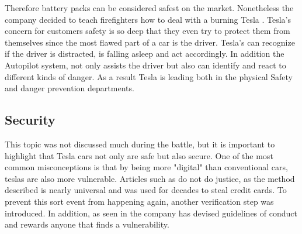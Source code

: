 \documentclass{article} %
\begin{document}
Therefore battery packs can be considered safest on the market.%
Nonetheless the company decided to teach firefighters how to deal with a burning Tesla \cite{Tesla Training Fire}.%
\newline Tesla's concern for customers safety is so deep that they even try to protect them from themselves since the most flawed part of a car is the driver.%
\newline Tesla's can recognize if the driver is distracted, is falling asleep and act accordingly.%
In addition the Autopilot system,  not only assists the driver but also can identify and react to different kinds of danger. %
\newline As a result Tesla is leading both in the physical Safety and danger prevention departments.


\subsection{Security}
This topic was not discussed much during the battle, but it is important to highlight that Tesla cars not only are safe but also secure.%
\newline One of the most common misconceptions is that by being more "digital" than conventional cars, teslas are also more vulnerable.
Articles such as \cite{Security:Theft} do not do justice, as the method described is nearly universal and was used for decades to steal credit cards.%
To prevent this sort event from happening again, another verification step was introduced.%
\newline In addition, as seen in \cite{Security:Methods} the company has devised guidelines of conduct and rewards anyone that finds a vulnerability.
\end{document}
